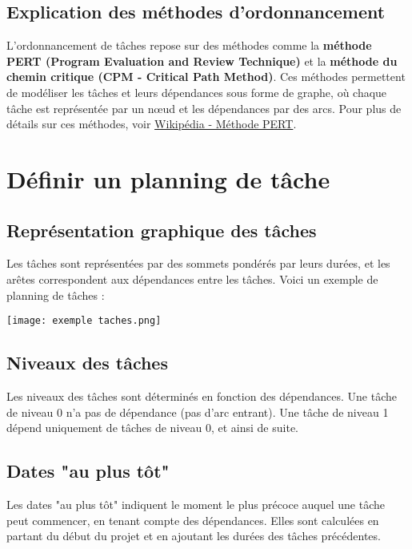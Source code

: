 \documentclass[10pt,a4paper]{article}
\begin{document}
\subsection*{Explication des méthodes d'ordonnancement}
L'ordonnancement de tâches repose sur des méthodes comme la \textbf{méthode PERT (Program Evaluation and Review Technique)} et la \textbf{méthode du chemin critique (CPM - Critical Path Method)}. Ces méthodes permettent de modéliser les tâches et leurs dépendances sous forme de graphe, où chaque tâche est représentée par un nœud et les dépendances par des arcs. Pour plus de détails sur ces méthodes, voir \href{https://fr.wikipedia.org/wiki/Méthode_PERT}{Wikipédia - Méthode PERT}.

\section*{Définir un planning de tâche}

\subsection*{Représentation graphique des tâches}
Les tâches sont représentées par des sommets pondérés par leurs durées, et les arêtes correspondent aux dépendances entre les tâches. Voici un exemple de planning de tâches :

\texttt{[image: exemple taches.png]}

\subsection*{Niveaux des tâches}
Les niveaux des tâches sont déterminés en fonction des dépendances. Une tâche de niveau 0 n'a pas de dépendance (pas d'arc entrant). Une tâche de niveau 1 dépend uniquement de tâches de niveau 0, et ainsi de suite.

\subsection*{Dates "au plus tôt"}
Les dates "au plus tôt" indiquent le moment le plus précoce auquel une tâche peut commencer, en tenant compte des dépendances. Elles sont calculées en partant du début du projet et en ajoutant les durées des tâches précédentes.
\end{document}
